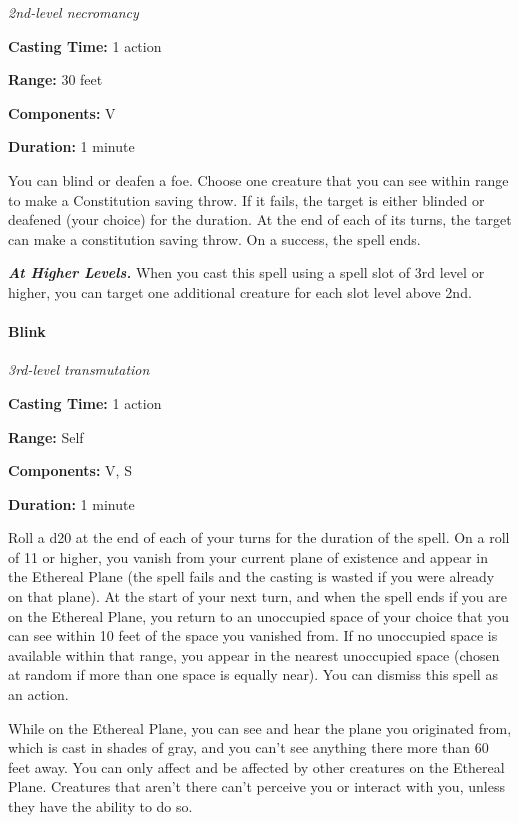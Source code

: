 \documentclass[
]{article}
\begin{document}
\emph{2nd-level necromancy}

\textbf{Casting Time:} 1 action

\textbf{Range:} 30 feet

\textbf{Components:} V

\textbf{Duration:} 1 minute

You can blind or deafen a foe. Choose one creature that you can see
within range to make a Constitution saving throw. If it fails, the
target is either blinded or deafened (your choice) for the duration. At
the end of each of its turns, the target can make a constitution saving
throw. On a success, the spell ends.

\emph{\textbf{At Higher Levels.}} When you cast this spell using a spell
slot of 3rd level or higher, you can target one additional creature for
each slot level above 2nd.

\hypertarget{blink}{%
\paragraph{Blink}\label{blink}}

\emph{3rd-level transmutation}

\textbf{Casting Time:} 1 action

\textbf{Range:} Self

\textbf{Components:} V, S

\textbf{Duration:} 1 minute

Roll a d20 at the end of each of your turns for the duration of the
spell. On a roll of 11 or higher, you vanish from your current plane of
existence and appear in the Ethereal Plane (the spell fails and the
casting is wasted if you were already on that plane). At the start of
your next turn, and when the spell ends if you are on the Ethereal
Plane, you return to an unoccupied space of your choice that you can see
within 10 feet of the space you vanished from. If no unoccupied space is
available within that range, you appear in the nearest unoccupied space
(chosen at random if more than one space is equally near). You can
dismiss this spell as an action.

While on the Ethereal Plane, you can see and hear the plane you
originated from, which is cast in shades of gray, and you can't see
anything there more than 60 feet away. You can only affect and be
affected by other creatures on the Ethereal Plane. Creatures that aren't
there can't perceive you or interact with you, unless they have the
ability to do so.
\end{document}
